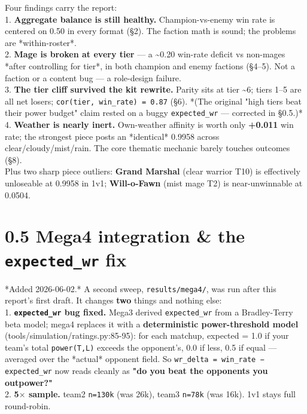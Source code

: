 \documentclass[10pt]{article}
\begin{document}
Four findings carry the report:\\

1. \textbf{Aggregate balance is still healthy.} Champion-vs-enemy win rate is centered on 0.50 in every format (\S{}2). The faction math is sound; the problems are *within-roster*.\\
2. \textbf{Mage is broken at every tier} --- a \textasciitilde{}0.20 win-rate deficit vs non-mages *after controlling for tier*, in both champion and enemy factions (\S{}4--5). Not a faction or a content bug --- a role-design failure.\\
3. \textbf{The tier cliff survived the kit rewrite.} Parity sits at tier \textasciitilde{}6; tiers 1--5 are all net losers; \texttt{cor(\allowbreak{}tier,\allowbreak{} win\_\allowbreak{}rate)\allowbreak{} = 0.\allowbreak{}87} (\S{}6). *(The original "high tiers beat their power budget" claim rested on a buggy \texttt{expected\_\allowbreak{}wr} --- corrected in \S{}0.5.)*\\
4. \textbf{Weather is nearly inert.} Own-weather affinity is worth only \textbf{+0.011} win rate; the strongest piece posts an *identical* 0.9958 across clear/cloudy/mist/rain. The core thematic mechanic barely touches outcomes (\S{}8).\\

Plus two sharp piece outliers: \textbf{Grand Marshal} (clear warrior T10) is effectively unloseable at 0.9958 in 1v1; \textbf{Will-o-Fawn} (mist mage T2) is near-unwinnable at 0.0504.\\


\section*{0.5 Mega4 integration \& the \texttt{expected\_\allowbreak{}wr} fix}

*Added 2026-06-02.* A second sweep, \texttt{results/\allowbreak{}mega4/\allowbreak{}}, was run after this report's first draft. It changes \textbf{two} things and nothing else:\\

1. \textbf{\texttt{expected\_\allowbreak{}wr} bug fixed.} Mega3 derived \texttt{expected\_\allowbreak{}wr} from a Bradley-Terry beta model; mega4 replaces it with a \textbf{deterministic power-threshold model} (tools/simulation/ratings.py:85-95): for each matchup, expected = 1.0 if your team's total \texttt{power(\allowbreak{}T,\allowbreak{}L)\allowbreak{}} exceeds the opponent's, 0.0 if less, 0.5 if equal --- averaged over the *actual* opponent field. So \texttt{wr\_\allowbreak{}delta = win\_\allowbreak{}rate − expected\_\allowbreak{}wr} now reads cleanly as \textbf{"do you beat the opponents you outpower?"}\\
2. \textbf{5$\times$ sample.} team2 \texttt{n=130k} (was 26k), team3 \texttt{n=78k} (was 16k). 1v1 stays full round-robin.\\
\end{document}
